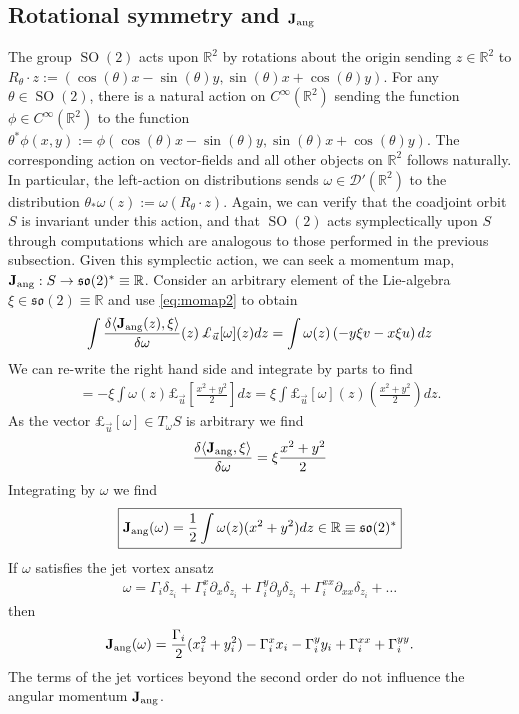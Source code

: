 \documentclass[12pt]{amsart}
\newcommand{\R}{\ensuremath{\mathbb{R}}}
\theoremstyle{remark}
\DeclareMathOperator{\SO}{SO}
\begin{document}
\subsection{Rotational symmetry and ${\bf J}_{\rm ang}$}
The group $\SO(2)$ acts upon $\mathbb{R}^2$ by rotations about the origin sending $z \in \R^2$ to $R_\theta \cdot z := ( \cos(\theta)x-\sin(\theta)y,\sin(\theta)x+\cos(\theta)y )$.
For any $\theta \in \SO(2)$, there is a natural action on $C^{\infty}(\mathbb{R}^2)$ sending the function $\phi \in C^{\infty}(\mathbb{R}^2)$ to the function $\theta^*\phi(x,y) := \phi(\cos(\theta)x-\sin(\theta)y,\sin(\theta)x+\cos(\theta)y)$.  The corresponding action on vector-fields and all other objects on $\mathbb{R}^2$ follows naturally.  
 In particular, the left-action on distributions sends $\omega \in \mathcal{D}'(\mathbb{R}^2)$ to the distribution $\theta_* \omega(z) := \omega( R_\theta \cdot z)$.
Again, we can verify that the coadjoint orbit $S$ is invariant under this action, and that $\SO(2)$ acts symplectically upon $S$
through computations which are analogous to those performed in the previous subsection.
Given this symplectic action, we can seek a momentum map, ${\bf J}_{\rm ang}:S \to \mathfrak{so}(2)^* \equiv \mathbb{R}$.  Consider an arbitrary element of the Lie-algebra $\xi \in \mathfrak{so}(2) \equiv \mathbb{R}$ and use \eqref{eq:momap2} to obtain
\begin{align*}
  \int  \frac{\delta  \langle {\bf J}_{\rm ang} (z) , \xi \rangle }{\delta \omega} (z) \, \pounds_{\vec{u}}[\omega] (z) dz
  = \int \omega(z) \left( -y\xi v - x\xi u \right) dz
\end{align*}
We can re-write the right hand side and integrate by parts to find
\begin{align*}
  = -\xi \int \omega(z) \pounds_{\vec{u}} \left[\frac{x^2+y^2}{2}\right] dz
  = \xi \int \pounds_{\vec{u}}[\omega](z) \left( \frac{x^2+y^2}{2} \right) dz.
\end{align*}
As the vector $\pounds_{\vec{u}}[\omega] \in T_\omega S$ is arbitrary we find
\begin{align*}
  \frac{\delta \langle {\bf J}_{\rm ang} , \xi \rangle}{\delta \omega} = \xi \frac{x^2+y^2}{2}
\end{align*}
Integrating by $\omega$ we find
\begin{align*}
  \boxed{
    {\bf J}_{\rm ang}(\omega) = \frac{1}{2}\int \omega(z) ( x^2 + y^2) dz \in \mathbb{R} \equiv \mathfrak{so}(2)^*
    }
\end{align*}
If $\omega$ satisfies the jet vortex ansatz
\begin{align*}
  \omega = \Gamma_i \delta_{z_i} + \Gamma_i^x \partial_x \delta_{z_i} + \Gamma_i^y \partial_y \delta_{z_i} + \Gamma_i^{xx} \partial_{xx} \delta_{z_i} + \dots
\end{align*}
then
\begin{align*}
  {\bf J}_{\rm ang}(\omega) = \frac{\Gamma_i}{2} (x_i^2 + y_i^2) - \Gamma_i^x x_i - \Gamma_i^y y_i + \Gamma_i^{xx} + \Gamma_i^{yy} .
\end{align*}
The terms of the jet vortices beyond the second order do not influence the angular momentum ${\bf J}_{\rm ang}$.
\end{document}
